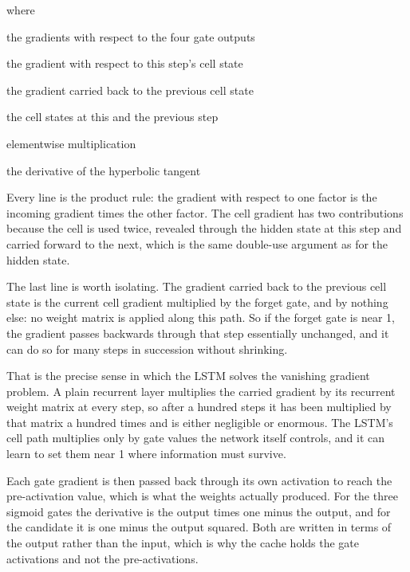 \noindent where
\begin{description}[leftmargin=2.4em,style=nextline,font=\normalfont\ttfamily]\setlength\itemsep{1pt}
  \item[{$\mathrm{d}o,\,\mathrm{d}f,\,\mathrm{d}i,\,\mathrm{d}g$}] \normalfont the gradients with respect to the four gate outputs
  \item[{$\mathrm{d}c$}] \normalfont the gradient with respect to this step's cell state
  \item[{$\mathrm{d}c_{t-1}$}] \normalfont the gradient carried back to the previous cell state
  \item[{$c_t,\,c_{t-1}$}] \normalfont the cell states at this and the previous step
  \item[{$\odot$}] \normalfont elementwise multiplication
  \item[{$1-\tanh^2$}] \normalfont the derivative of the hyperbolic tangent
\end{description}
Every line is the product rule: the gradient with respect to one factor is the incoming gradient times the other factor. The cell gradient has two contributions because the cell is used twice, revealed through the hidden state at this step and carried forward to the next, which is the same double-use argument as for the hidden state.


The last line is worth isolating. The gradient carried back to the previous cell state is the current cell gradient multiplied by the forget gate, and by nothing else: no weight matrix is applied along this path. So if the forget gate is near 1, the gradient passes backwards through that step essentially unchanged, and it can do so for many steps in succession without shrinking.

That is the precise sense in which the LSTM solves the vanishing gradient problem. A plain recurrent layer multiplies the carried gradient by its recurrent weight matrix at every step, so after a hundred steps it has been multiplied by that matrix a hundred times and is either negligible or enormous. The LSTM's cell path multiplies only by gate values the network itself controls, and it can learn to set them near 1 where information must survive.


Each gate gradient is then passed back through its own activation to reach the pre-activation value, which is what the weights actually produced. For the three sigmoid gates the derivative is the output times one minus the output, and for the candidate it is one minus the output squared. Both are written in terms of the output rather than the input, which is why the cache holds the gate activations and not the pre-activations.


